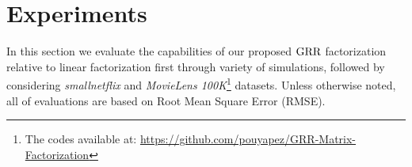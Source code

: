 \documentclass{article}
\newcommand{\R}{\ensuremath{\Real}}
\begin{document}












\section{Experiments}
\label{sec:results}

In this section we evaluate the capabilities of our proposed $\text{GRR}$ factorization relative to linear factorization first through variety of simulations, followed by considering \emph{smallnetflix} and \emph{MovieLens 100K}\footnote{The codes available at: \url{https://github.com/pouyapez/GRR-Matrix-Factorization}} datasets. 
Unless otherwise noted, all of evaluations are based on Root Mean Square Error (RMSE).
\end{document}
